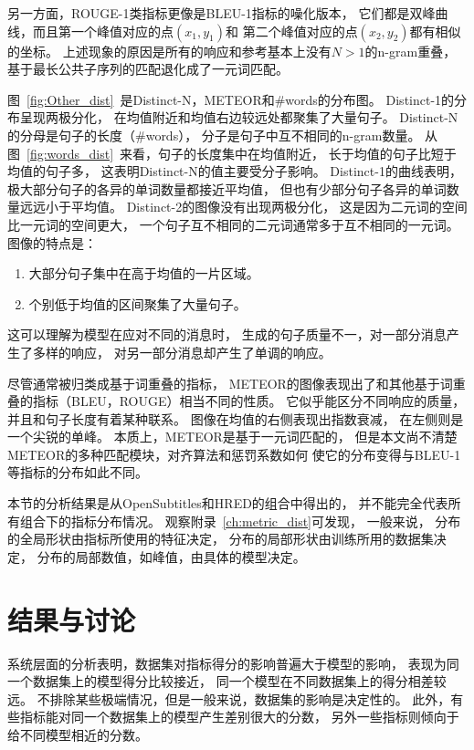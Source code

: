 另一方面，ROUGE-1类指标更像是BLEU-1指标的噪化版本，
它们都是双峰曲线，而且第一个峰值对应的点$(x_1, y_1)$和
第二个峰值对应的点$(x_2, y_2)$都有相似的坐标。
上述现象的原因是所有的响应和参考基本上没有$N > 1$的n-gram重叠，
基于最长公共子序列的匹配退化成了一元词匹配。


图~\ref{fig:Other_dist}~是Distinct-N，METEOR和\#words的分布图。
Distinct-1的分布呈现两极分化，
在均值附近和均值右边较远处都聚集了大量句子。
Distinct-N的分母是句子的长度（\#words），
分子是句子中互不相同的n-gram数量。
从图~\ref{fig:words_dist}~来看，句子的长度集中在均值附近，
长于均值的句子比短于均值的句子多，
这表明Distinct-N的值主要受分子影响。
Distinct-1的曲线表明，极大部分句子的各异的单词数量都接近平均值，
但也有少部分句子各异的单词数量远远小于平均值。
Distinct-2的图像没有出现两极分化，
这是因为二元词的空间比一元词的空间更大，
一个句子互不相同的二元词通常多于互不相同的一元词。
图像的特点是：
\begin{enumerate}
    \item 大部分句子集中在高于均值的一片区域。
    \item 个别低于均值的区间聚集了大量句子。
\end{enumerate}
这可以理解为模型在应对不同的消息时，
生成的句子质量不一，对一部分消息产生了多样的响应，
对另一部分消息却产生了单调的响应。

尽管通常被归类成基于词重叠的指标，
METEOR的图像表现出了和其他基于词重叠的指标（BLEU，ROUGE）相当不同的性质。
它似乎能区分不同响应的质量，并且和句子长度有着某种联系。
图像在均值的右侧表现出指数衰减， 在左侧则是一个尖锐的单峰。
本质上，METEOR是基于一元词匹配的，
但是本文尚不清楚METEOR的多种匹配模块，对齐算法和惩罚系数如何
使它的分布变得与BLEU-1等指标的分布如此不同。

本节的分析结果是从OpenSubtitles和HRED的组合中得出的，
并不能完全代表所有组合下的指标分布情况。
观察附录~\ref{ch:metric_dist}可发现， 一般来说，
分布的全局形状由指标所使用的特征决定，
分布的局部形状由训练所用的数据集决定，
分布的局部数值，如峰值，由具体的模型决定。

\section{结果与讨论}\label{sec:result_and_discussion}
系统层面的分析表明，数据集对指标得分的影响普遍大于模型的影响，
表现为同一个数据集上的模型得分比较接近，
同一个模型在不同数据集上的得分相差较远。
不排除某些极端情况，但是一般来说，数据集的影响是决定性的。
此外，有些指标能对同一个数据集上的模型产生差别很大的分数，
另外一些指标则倾向于给不同模型相近的分数。

